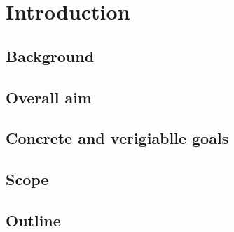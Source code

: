 \chapter{Introduction}\label{introduction}

\section{Background}
\section{Overall aim}
\section{Concrete and verigiablle goals}
\section{Scope}
\section{Outline}



